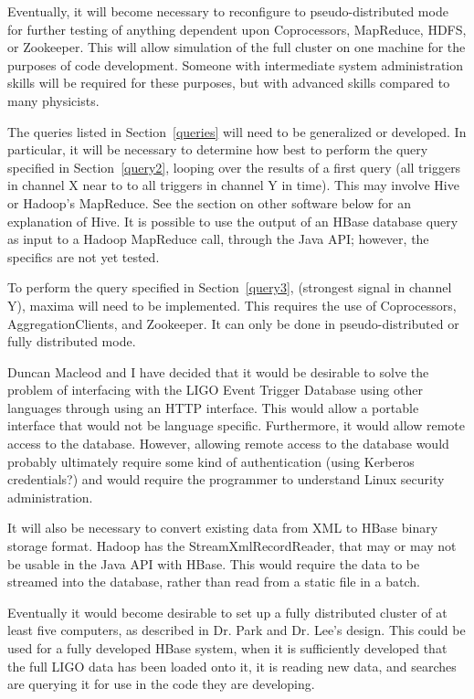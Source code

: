 \documentclass{article}
\begin{document}
Eventually, it will become necessary to reconfigure to
pseudo-distributed mode for further testing of anything dependent upon
Coprocessors, MapReduce, HDFS, or Zookeeper. This will allow simulation of the
full cluster on one machine for the purposes of code
development. Someone with intermediate system administration skills
will be required for these purposes, but with advanced skills compared
to many physicists.

The queries listed in Section~\ref{queries} will need to be
generalized or developed. In particular, it will be necessary to
determine how best to perform the query specified in
Section~\ref{query2}, looping over the results of a first query (all
triggers in channel X near to to all triggers in channel Y in
time). This may involve Hive or Hadoop's MapReduce. See the section on
other software below for an explanation of Hive. It is possible to use
the output of an HBase database query as input to a Hadoop MapReduce
call, through the Java API; however, the specifics are not yet tested.

To perform the query specified in Section~\ref{query3}, (strongest
signal in channel Y), maxima will need to be implemented. This
requires the use of Coprocessors, AggregationClients, and
Zookeeper. It can only be done in pseudo-distributed or fully
distributed mode.

Duncan Macleod and I have decided that it would be desirable to solve
the problem of interfacing with the LIGO Event Trigger Database using
other languages through using an HTTP interface. This would allow a
portable interface that would not be language specific. Furthermore,
it would allow remote access to the database. However, allowing remote
access to the database would probably ultimately require some kind of
authentication (using Kerberos credentials?) and would require the
programmer to understand Linux security administration.

It will also be necessary to convert existing data from XML to HBase
binary storage format. Hadoop has the StreamXmlRecordReader, that may or
may not be usable in the Java API with HBase. This would require the
data to be streamed into the database, rather than read from a static
file in a batch.

Eventually it would become desirable to set up a fully distributed
cluster of at least five computers, as described in Dr. Park and
Dr. Lee's design. This could be used for a fully developed HBase
system, when it is sufficiently developed that the full LIGO data has
been loaded onto it, it is reading new data, and searches are querying
it for use in the code they are developing.
\end{document}
